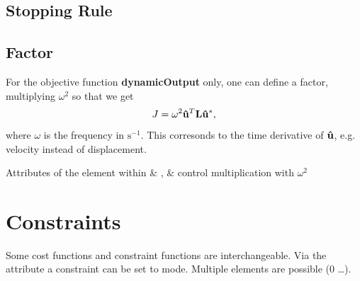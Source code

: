 \subsection{Stopping Rule}

\subsection{Factor}
\label{sec:factor}
For the objective function \textbf{dynamicOutput} only, one can define a factor,
multiplying $\omega^2$ so that we get
\begin{equation}
  J = \omega^2 {\bf \hat{u}}^T {\bf L} {\bf \hat{u}}^*,
\end{equation} 
where $\omega$ is the frequency in $\textrm{s}^{-1}$. This corresonds to the
time derivative of $\bf \hat{u}$, e.g. velocity instead of displacement.

\begin{xatlist}{Attributes of the  element within
}
 & ,  & control multiplication
with $\omega^2$ 
\end{xatlist}

\section{Constraints}
\label{sec:constraints}
Some cost functions and constraint functions are interchangeable. Via the
 attribute a constraint can be set to  mode. Multiple
 elements are possible (0 \ldots *). 

